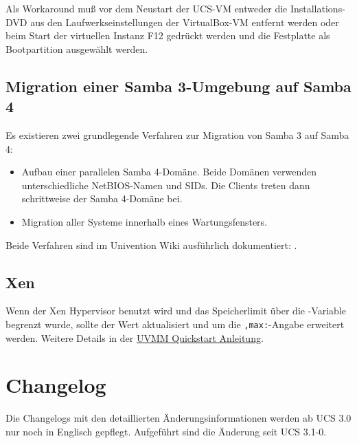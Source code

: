 Als Workaround muß vor dem Neustart der UCS-VM entweder die
Installations-DVD aus den Laufwerkseinstellungen der VirtualBox-VM
entfernt werden oder beim Start der virtuellen Instanz F12 gedrückt
werden und die Festplatte als Bootpartition ausgewählt werden.

\section{Migration einer Samba 3-Umgebung auf Samba 4}
\label{samba-migration}

Es existieren zwei grundlegende Verfahren zur Migration von Samba 3 auf Samba
4:

\begin{itemize}
\item Aufbau einer parallelen Samba 4-Domäne. Beide Domänen verwenden
unterschiedliche NetBIOS-Namen und SIDs. Die Clients treten dann schrittweise
der Samba 4-Domäne bei.
\item Migration aller Systeme innerhalb eines Wartungsfensters.
\end{itemize}

Beide Verfahren sind im Univention Wiki ausführlich dokumentiert:
.

\section{Xen} %
Wenn der Xen Hypervisor benutzt wird und das Speicherlimit über die \ucsUCR{}-Variable  begrenzt wurde, sollte der Wert aktualisiert und um die \texttt{,max:}-Angabe erweitert werden.
Weitere Details in der \href{http://wiki.univention.de/index.php?title=UVMM_Quickstart-3.1#Konfiguration_der_Dom0}{UVMM Quickstart Anleitung}.

\chapter{Changelog}

Die Changelogs mit den detaillierten Änderungsinformationen werden ab UCS 3.0
nur noch in Englisch gepflegt. Aufgeführt sind die Änderung seit UCS 3.1-0.






